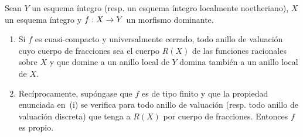 \documentclass[oneside,10pt]{amsart}
\makeatletter
\newcommand{\ega@arrow}[2]{\mathchoice{#1}{#2}{#2}{#2}}
\renewcommand{\to}{\ega@arrow{\longrightarrow}{\rightarrow}}
\let\EGAOriginalLabel\label
\renewcommand{\label}[1]{\phantomsection\EGAOriginalLabel{#1}}
\makeatother
\begin{document}

\begin{corollary}[7.3.10]
\label{II.7.3.10}
Sean $Y$ un esquema íntegro \textup{(resp.} un esquema íntegro localmente noetheriano), $X$ un esquema íntegro y $f:X\to Y$ un morfismo dominante.
\begin{enumerate}
  \item[\rm{(i)}] Si $f$ es cuasi-compacto y universalmente cerrado, todo anillo de valuación cuyo cuerpo de fracciones sea el cuerpo $R(X)$ de las funciones racionales sobre $X$ y que domine a un anillo local de $Y$ domina también a un anillo local de $X$.
  \item[\rm{(ii)}] Recíprocamente, supóngase que $f$ es de tipo finito y que la propiedad enunciada en~\textup{(i)} se verifica para todo anillo de valuación \textup{(resp.} todo anillo de valuación discreta) que tenga a $R(X)$ por cuerpo de fracciones.
  Entonces $f$ es propio.
\end{enumerate}
\end{corollary}
\end{document}
